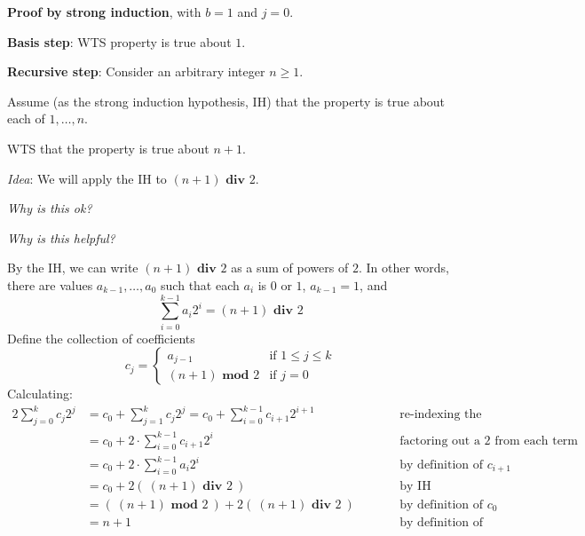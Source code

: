 \documentclass[12pt, oneside]{article}
\begin{document}
{\bf Proof by strong induction}, with $b=1$ and $j=0$.


{\bf Basis step}:  WTS property is true about  $1$.

\phantom{Choose $a_0 = 1$, then $(a_0)_2 = 1 \cdot 2^0 = 1$.}
\vspace{80pt}


{\bf Recursive step}: Consider an arbitrary integer $n \geq 1$.

Assume (as the strong induction hypothesis, IH) that the property is true about  each of $1, \ldots, n$.  

WTS that the property is true about $n+1$.

{\it Idea}: We will apply the IH to $(n+1) \textbf{ div } 2$.

{\it Why is this ok?}

\vspace{100pt}

{\it Why is this helpful?}

By the IH, we can write $(n+1) \textbf{ div } 2$ as 
a sum of powers of $2$. In other words, 
there are values $a_{k-1}, \ldots, a_0$ such that each $a_i$ is $0$ or $1$, $a_{k-1} = 1$, 
and
\[
    \sum_{i=0}^{k-1} a_i 2^i = (n+1) \textbf{ div } 2   
\]
Define the collection of coefficients
\[
   c_{j} = 
   \begin{cases}
        a_{j-1} \qquad&\text{if $1 \leq j \leq k$}\\
        (n+1) \textbf{ mod } 2 &\text{if $j = 0$}
   \end{cases}
\]
Calculating: 
\begin{alignat*}{2}
    \sum_{j=0}^k c_j 2^j &= c_0 + \sum_{j=1}^k c_j 2^j 
    = c_0 + \sum_{i=0}^{k-1} c_{i+1} 2^{i+1} &\qquad &\text{re-indexing the summation}\\
    &= c_0 + 2 \cdot \sum_{i=0}^{k-1} c_{i+1}2^i &\qquad &\text{factoring out a $2$ from each term in the sum}\\
    &= c_0 + 2 \cdot \sum_{i=0}^{k-1} a_{i} 2^i &\qquad &\text{by definition of $c_{i+1}$}\\
    &= c_0 + 2 \left(~(n+1) \textbf{ div } 2 ~\right) &\qquad &\text{by IH} \\
    &= \left(~ (n+1) \textbf{ mod } 2 ~\right ) + 2 \left(~(n+1) \textbf{ div } 2 ~\right) &\qquad &\text{by definition of $c_0$} \\
    &= n+1 &\qquad&\text{by definition of long division}
\end{alignat*}
\end{document}
